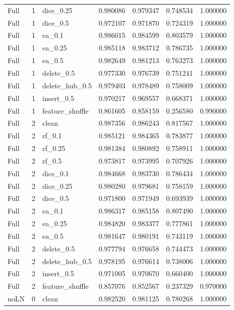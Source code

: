 \documentclass[UTF8,a4paper,11pt,fontset=fandol]{ctexart}
\begin{document}
{\begin{longtable}{lrlrrrr}
Full & 1 & dice\_0.25 & 0.980086 & 0.979347 & 0.748534 & 1.000000 \\
Full & 1 & dice\_0.5 & 0.972107 & 0.971870 & 0.724319 & 1.000000 \\
Full & 1 & ea\_0.1 & 0.986015 & 0.984599 & 0.803579 & 1.000000 \\
Full & 1 & ea\_0.25 & 0.985118 & 0.983712 & 0.786735 & 1.000000 \\
Full & 1 & ea\_0.5 & 0.982649 & 0.981213 & 0.763273 & 1.000000 \\
Full & 1 & delete\_0.5 & 0.977330 & 0.976739 & 0.751241 & 1.000000 \\
Full & 1 & delete\_hub\_0.5 & 0.979403 & 0.978489 & 0.758009 & 1.000000 \\
Full & 1 & insert\_0.5 & 0.970217 & 0.969557 & 0.668371 & 1.000000 \\
Full & 1 & feature\_shuffle & 0.861605 & 0.858159 & 0.256580 & 0.990000 \\
Full & 2 & clean & 0.987356 & 0.986243 & 0.817567 & 1.000000 \\
Full & 2 & rf\_0.1 & 0.985121 & 0.984365 & 0.783877 & 1.000000 \\
Full & 2 & rf\_0.25 & 0.981384 & 0.980892 & 0.758911 & 1.000000 \\
Full & 2 & rf\_0.5 & 0.973817 & 0.973995 & 0.707926 & 1.000000 \\
Full & 2 & dice\_0.1 & 0.984668 & 0.983730 & 0.786434 & 1.000000 \\
Full & 2 & dice\_0.25 & 0.980280 & 0.979681 & 0.758159 & 1.000000 \\
Full & 2 & dice\_0.5 & 0.971800 & 0.971949 & 0.693939 & 1.000000 \\
Full & 2 & ea\_0.1 & 0.986317 & 0.985158 & 0.807490 & 1.000000 \\
Full & 2 & ea\_0.25 & 0.984820 & 0.983377 & 0.777861 & 1.000000 \\
Full & 2 & ea\_0.5 & 0.981647 & 0.980191 & 0.743119 & 1.000000 \\
Full & 2 & delete\_0.5 & 0.977794 & 0.976658 & 0.744473 & 1.000000 \\
Full & 2 & delete\_hub\_0.5 & 0.978195 & 0.976614 & 0.738006 & 1.000000 \\
Full & 2 & insert\_0.5 & 0.971005 & 0.970670 & 0.660400 & 1.000000 \\
Full & 2 & feature\_shuffle & 0.857076 & 0.852567 & 0.237329 & 0.970000 \\
noLN & 0 & clean & 0.982520 & 0.981125 & 0.780268 & 1.000000 \\

\end{longtable}}
\end{document}
